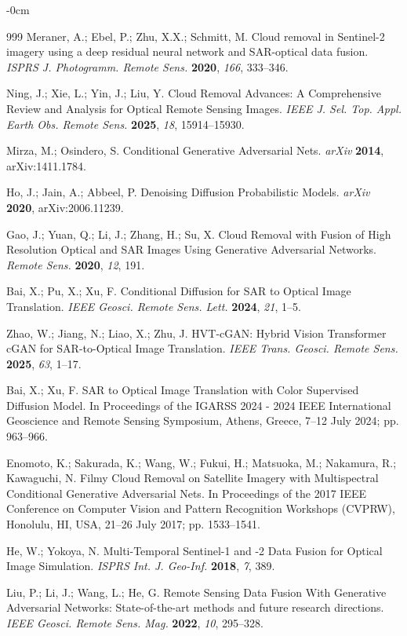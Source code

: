 \documentclass[remotesensing,article,submit,pdftex,moreauthors]{Definitions/mdpi}
\begin{document}
\begin{adjustwidth}{-\extralength}{0cm}
\begin{thebibliography}{999}
Meraner, A.; Ebel, P.; Zhu, X.X.; Schmitt, M. Cloud removal in Sentinel-2 imagery using a deep residual neural network and SAR-optical data fusion. {\em ISPRS J. Photogramm. Remote Sens.} {\bf 2020}, {\em 166}, 333--346.

Ning, J.; Xie, L.; Yin, J.; Liu, Y. Cloud Removal Advances: A Comprehensive Review and Analysis for Optical Remote Sensing Images. {\em IEEE J. Sel. Top. Appl. Earth Obs. Remote Sens.} {\bf 2025}, {\em 18}, 15914--15930.

Mirza, M.; Osindero, S. Conditional Generative Adversarial Nets. {\em arXiv} {\bf 2014}, arXiv:1411.1784.

Ho, J.; Jain, A.; Abbeel, P. Denoising Diffusion Probabilistic Models. {\em arXiv} {\bf 2020}, arXiv:2006.11239.

Gao, J.; Yuan, Q.; Li, J.; Zhang, H.; Su, X. Cloud Removal with Fusion of High Resolution Optical and SAR Images Using Generative Adversarial Networks. {\em Remote Sens.} {\bf 2020}, {\em 12}, 191.

Bai, X.; Pu, X.; Xu, F. Conditional Diffusion for SAR to Optical Image Translation. {\em IEEE Geosci. Remote Sens. Lett.} {\bf 2024}, {\em 21}, 1--5.

Zhao, W.; Jiang, N.; Liao, X.; Zhu, J. HVT-cGAN: Hybrid Vision Transformer cGAN for SAR-to-Optical Image Translation. {\em IEEE Trans. Geosci. Remote Sens.} {\bf 2025}, {\em 63}, 1--17.

Bai, X.; Xu, F. SAR to Optical Image Translation with Color Supervised Diffusion Model. In Proceedings of the IGARSS 2024 - 2024 IEEE International Geoscience and Remote Sensing Symposium, Athens, Greece, 7–12 July 2024; pp. 963--966.

Enomoto, K.; Sakurada, K.; Wang, W.; Fukui, H.; Matsuoka, M.; Nakamura, R.; Kawaguchi, N. Filmy Cloud Removal on Satellite Imagery with Multispectral Conditional Generative Adversarial Nets. In Proceedings of the 2017 IEEE Conference on Computer Vision and Pattern Recognition Workshops (CVPRW), Honolulu, HI, USA, 21–26 July 2017; pp. 1533--1541.

He, W.; Yokoya, N. Multi-Temporal Sentinel-1 and -2 Data Fusion for Optical Image Simulation. {\em ISPRS Int. J. Geo-Inf.} {\bf 2018}, {\em 7}, 389.

Liu, P.; Li, J.; Wang, L.; He, G. Remote Sensing Data Fusion With Generative Adversarial Networks: State-of-the-art methods and future research directions. {\em IEEE Geosci. Remote Sens. Mag.} {\bf 2022}, {\em 10}, 295--328.


\end{thebibliography}
\end{adjustwidth}
\end{document}
